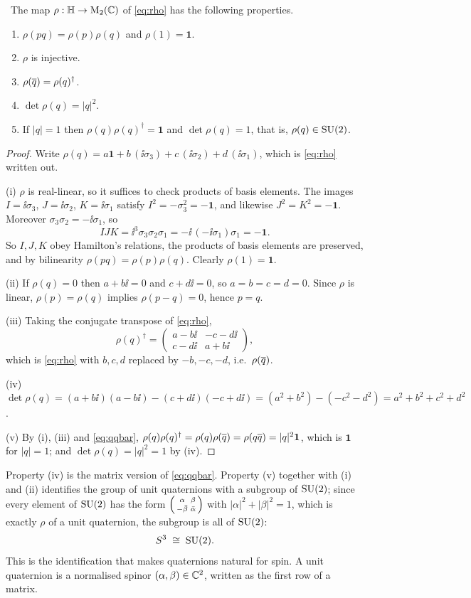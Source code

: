 \begin{theorem}\label{thm:rho}\ver\
The map $\rho:\mathbb{H}\to\mathrm{M}_2(\mathbb{C})$ of \eqref{eq:rho} has the following properties.
\begin{enumerate}[label=(\roman*)]
\item $\rho(pq)=\rho(p)\rho(q)$ and $\rho(1)=\mathbf 1$.
\item $\rho$ is injective.
\item $\rho(\overline{q})=\rho(q)^\dagger$.
\item $\det\rho(q)=|q|^2$.
\item If $|q|=1$ then $\rho(q)\rho(q)^\dagger=\mathbf 1$ and $\det\rho(q)=1$, that is, $\rho(q)\in\mathrm{SU}(2)$.
\end{enumerate}
\end{theorem}
\begin{proof}
Write $\rho(q)=a\mathbf 1+b\,(\ii\sigma_3)+c\,(\ii\sigma_2)+d\,(\ii\sigma_1)$, which is \eqref{eq:rho} written out.

(i) $\rho$ is real-linear, so it suffices to check products of basis elements. The images $I=\ii\sigma_3$, $J=\ii\sigma_2$, $K=\ii\sigma_1$ satisfy $I^2=-\sigma_3^2=-\mathbf 1$, and likewise $J^2=K^2=-\mathbf 1$. Moreover $\sigma_3\sigma_2=-\ii\sigma_1$, so
\[
IJK=\ii^3\sigma_3\sigma_2\sigma_1=-\ii\,(-\ii\sigma_1)\sigma_1=-\mathbf 1 .
\]
So $I,J,K$ obey Hamilton's relations, the products of basis elements are preserved, and by bilinearity $\rho(pq)=\rho(p)\rho(q)$. Clearly $\rho(1)=\mathbf 1$.

(ii) If $\rho(q)=0$ then $a+b\ii=0$ and $c+d\ii=0$, so $a=b=c=d=0$. Since $\rho$ is linear, $\rho(p)=\rho(q)$ implies $\rho(p-q)=0$, hence $p=q$.

(iii) Taking the conjugate transpose of \eqref{eq:rho},
\[
\rho(q)^\dagger=\begin{pmatrix}a-b\ii&-c-d\ii\\ c-d\ii&a+b\ii\end{pmatrix},
\]
which is \eqref{eq:rho} with $b,c,d$ replaced by $-b,-c,-d$, i.e.\ $\rho(\overline{q})$.

(iv) $\det\rho(q)=(a+b\ii)(a-b\ii)-(c+d\ii)(-c+d\ii)=(a^2+b^2)-(-c^2-d^2)=a^2+b^2+c^2+d^2$.

(v) By (i), (iii) and \eqref{eq:qqbar}, $\rho(q)\rho(q)^\dagger=\rho(q)\rho(\overline{q})=\rho(q\overline{q})=|q|^2\mathbf 1$, which is $\mathbf 1$ for $|q|=1$; and $\det\rho(q)=|q|^2=1$ by (iv).
\end{proof}


Property (iv) is the matrix version of \eqref{eq:qqbar}. Property (v) together with (i) and (ii) identifies the group of unit quaternions with a subgroup of $\mathrm{SU}(2)$; since every element of $\mathrm{SU}(2)$ has the form $\begin{psmallmatrix}\alpha&\beta\\-\bar\beta&\bar\alpha\end{psmallmatrix}$ with $|\alpha|^2+|\beta|^2=1$, which is exactly $\rho$ of a unit quaternion, the subgroup is all of $\mathrm{SU}(2)$:
\[
S^3\;\cong\;\mathrm{SU}(2).
\]
This is the identification that makes quaternions natural for spin. A unit quaternion is a normalised spinor $(\alpha,\beta)\in\mathbb{C}^2$, written as the first row of a matrix.

